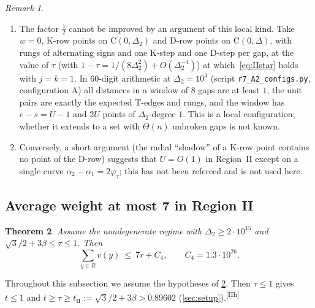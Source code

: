 \documentclass[11pt]{amsart}
\newtheorem{theorem}{Theorem}[section]
\theoremstyle{definition}
\theoremstyle{remark}
\newtheorem{remark}[theorem]{Remark}
\newcommand{\Dt}{\Delta_2}
\newcommand{\Cc}{\mathrm{C}}      %
\newcommand{\chk}[1]{\textsuperscript{[#1]}}
\begin{document}
\begin{remark}\label{rem:IIsharp}
\begin{enumerate}[leftmargin=2em,label=(\alph*)]
\item The factor $\frac12$ cannot be improved by an argument of this local kind. Take $w=0$, K-row points on $\Cc(0,\Dt)$ and D-row points on $\Cc(0,\Delta)$, with rungs of alternating signs and one K-step and one D-step per gap, at the value of $\tau$ (with $1-\tau=1/(8\Dt^2)+O(\Dt^{-4})$) at which~\eqref{eq:IIstar} holds with $j=k=1$. In $60$-digit arithmetic at $\Dt=10^4$ (script \texttt{r7\_A2\_configs.py}, configuration A) all distances in a window of $8$ gaps are at least $1$, the unit pairs are exactly the expected T-edges and rungs, and the window has $e-s=U-1$ and $2U$ points of $\Dt$-degree $1$. This is a local configuration; whether it extends to a set with $\Theta(n)$ unbroken gaps is not known.
\item Conversely, a short argument (the radial ``shadow'' of a K-row point contains no point of the D-row) suggests that $U=O(1)$ in Region~II except on a single curve $\alpha_2-\alpha_1=2\varphi_\tau$; this has not been refereed and is not used here.
\end{enumerate}
\end{remark}

\subsection{Average weight at most 7 in Region II}\label{sec:IIw}

\begin{theorem}\label{thm:IIw}
Assume the nondegenerate regime with $\Dt\ge2\cdot10^{15}$ and $\sqrt3/2+3\beta\le\tau\le1$. Then
\[
\sum_{y\in R}v(y)\ \le\ 7r+C_4,\qquad C_4=1.3\cdot10^{26}.
\]
\end{theorem}

Throughout this subsection we assume the hypotheses of \cref{thm:IIw}. Then $\tau\le1$ gives $t\le1$ and $t\ge\tau\ge t_{\mathrm{II}}:=\sqrt3/2+3\beta>0.89602$ (\cref{sec:setup}).\chk{IIh}
\end{document}
